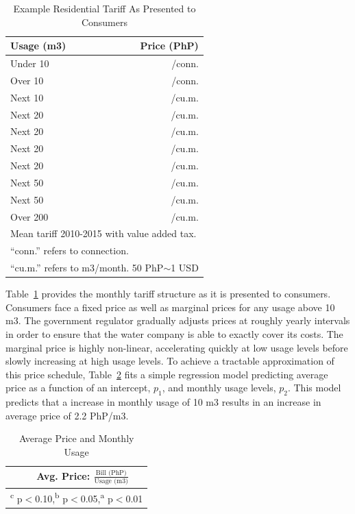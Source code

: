 \documentclass[12pt]{article}
\begin{document}
\begin{table}[H]
\centering
\caption{Example Residential Tariff As Presented to Consumers}\label{table:tarifftrue}
\vspace{-2mm}
\begin{tabular}{l*{1}{r}}
\toprule
Usage (m3) & Price (PhP) \\
\midrule
Under  10    &   /conn. \\
Over  10     &   /conn. \\
Next   10    &   /cu.m. \\
Next    20   &   /cu.m. \\
Next   20    &   /cu.m. \\
Next    20   &   /cu.m. \\
Next    20   &   /cu.m. \\
Next    50   &   /cu.m. \\
Next   50    &   /cu.m. \\
Over  200    &   /cu.m. \\
\bottomrule
\multicolumn{2}{l}{\scriptsize Mean tariff 2010-2015 with value added tax. }\\[-.5em]
\multicolumn{2}{l}{\scriptsize ``conn.'' refers to connection. }\\[-.5em]
\multicolumn{2}{l}{\scriptsize ``cu.m.'' refers to m3/month.  50 PhP$\sim$1 USD }
\end{tabular}
\end{table}

Table~\ref{table:tarifftrue} provides the monthly tariff structure as it is presented to consumers.  Consumers face a fixed price as well as marginal prices for any usage above 10 m3.  The government regulator gradually adjusts prices at roughly yearly intervals in order to ensure that the water company is able to exactly cover its costs.  The marginal price is highly non-linear, accelerating quickly at low usage levels before slowly increasing at high usage levels.  To achieve a tractable approximation of this price schedule, Table~\ref{table:tcd_predict} fits a simple regression model predicting average price as a function of an intercept, $p_1$, and monthly usage levels, $p_2$.  This model predicts that a increase in monthly usage of 10 m3 results in an increase in average price of 2.2 PhP/m3.  

\begin{table}[H]
\small
\centering
\caption{Average Price and Monthly Usage}\label{table:tcd_predict}
\vspace{-2mm}
\begin{tabular}{lc}
\toprule
& \small Avg. Price: $\frac{\text{Bill (PhP)}}{\text{Usage (m3)}}$    \\
\midrule 

\bottomrule
\multicolumn{2}{l}{\scriptsize \textsuperscript{c} p$<$0.10,\textsuperscript{b} p$<$0.05,\textsuperscript{a} p$<$0.01 }
\end{tabular}
\end{table}
\end{document}
